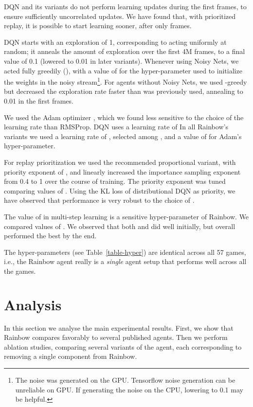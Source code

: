 \documentclass[letterpaper]{article} \usepackage{aaai18}  \usepackage{times}  \usepackage{helvet}  \usepackage{courier}  \usepackage{url}  \usepackage{graphicx}  \usepackage{amsmath,amssymb}
\begin{document}
DQN and its variants do not perform learning updates during the first  frames, to ensure sufficiently uncorrelated updates. We have found that, with prioritized replay, it is possible to start learning sooner, after only  frames. 

DQN starts with an exploration  of 1, corresponding to acting uniformly at random; it anneals the amount of exploration over the first 4M frames, to a final value of 0.1 (lowered to 0.01 in later variants). Whenever using Noisy Nets, we acted fully greedily (), with a value of  for the  hyper-parameter used to initialize the weights in the noisy stream\footnote{The noise was generated on the GPU. Tensorflow noise generation can be unreliable on GPU. If generating the noise on the CPU, lowering  to 0.1 may be helpful.}.  For agents without Noisy Nets, we used -greedy but decreased the exploration rate faster than was previously used, annealing  to 0.01 in the first  frames.

We used the Adam optimizer \cite{kingma2014adam}, which we found less sensitive to the choice of the learning rate than RMSProp. DQN uses a learning rate of  In all Rainbow's variants we used a learning rate of , selected among , and a value of  for Adam's  hyper-parameter.

For replay prioritization we used the recommended proportional variant, with priority exponent  of , and linearly increased the importance sampling exponent  from 0.4 to 1 over the course of training. The priority exponent  was tuned comparing values of . Using the KL loss of distributional DQN as priority, we have observed that performance is very robust to the choice of .

The value of  in multi-step learning is a sensitive hyper-parameter of Rainbow. We compared values of .  We observed that both  and  did well initially, but overall  performed the best by the end. 

The hyper-parameters (see Table~\ref{table-hyper}) are identical across all 57 games, i.e., the Rainbow agent really is a \emph{single} agent setup that performs well across all the games.

\section{Analysis}
In this section we analyse the main experimental results. First, we show that Rainbow compares favorably to several published agents. Then we perform ablation studies, comparing several variants of the agent, each corresponding to removing a single component from Rainbow.
\end{document}
